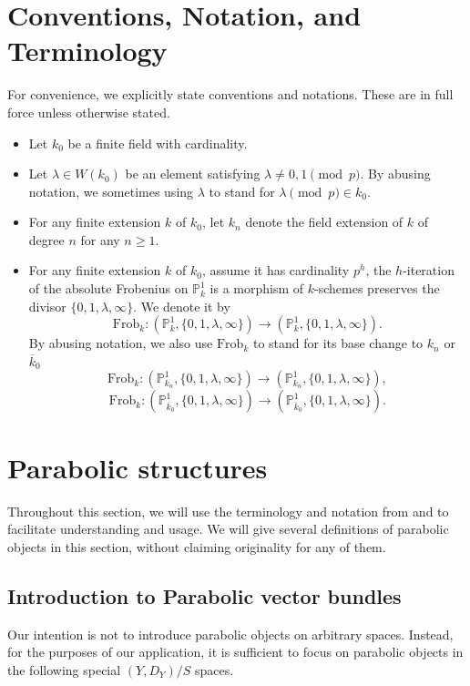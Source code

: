 \documentclass[12pt,twoside]{book}
\theoremstyle{plain}
\theoremstyle{definition}
\theoremstyle{remark}
\numberwithin{equation}{section}
\def\Frob{\mathrm{Frob}}
\def\bark{{\overline k}_0}
\begin{document}
\section*{Conventions, Notation, and Terminology}
For convenience, we explicitly state conventions and notations. These are in full force unless otherwise stated.
\begin{itemize}
\item Let $k_0$ be a finite field with cardinality.
\item Let $\lambda\in W(k_0)$ be an element satisfying $\lambda\neq 0,1\pmod{p}$. By abusing notation, we sometimes using $\lambda$ to stand for $\lambda\pmod{p} \in k_0$.
\item For any finite extension $k$ of $k_0$, let $k_n$ denote the field extension of $k$ of degree $n$ for any $n\geq1$.
\item For any finite extension $k$ of $k_0$, assume it has cardinality $p^h$, the $h$-iteration of the absolute Frobenius on $\mathbb P^1_{k}$ is a morphism of $k$-schemes preserves the divisor $\{0,1,\lambda,\infty\}$. We denote it by
\[\Frob_k\colon (\mathbb P_k^1,\{0,1,\lambda,\infty\}) \rightarrow (\mathbb P_k^1,\{0,1,\lambda,\infty\}).\]
By abusing notation, we also use $\Frob_k$ to stand for its base change to $k_n$ or $\bark$
\[ \Frob_k\colon (\mathbb P_{k_n}^1,\{0,1,\lambda,\infty\}) \rightarrow (\mathbb P_{k_n}^1,\{0,1,\lambda,\infty\}),\]
\[ \Frob_k\colon (\mathbb P_{\bark}^1,\{0,1,\lambda,\infty\}) \rightarrow (\mathbb P_{\bark}^1,\{0,1,\lambda,\infty\}).\]
\end{itemize}

\newpage

\section{\bf Parabolic structures} \label{sec_main_para}




Throughout this section, we will use the terminology and notation from \cite{IySi07} and \cite{KrSh20} to facilitate understanding and usage. We will give several definitions of parabolic objects in this section, without claiming originality for any of them.

\subsection{Introduction to Parabolic vector bundles}

Our intention is not to introduce parabolic objects on arbitrary spaces. Instead, for the purposes of our application, it is sufficient to focus on parabolic objects in the following special $(Y,D_Y)/S$ spaces.
\end{document}
